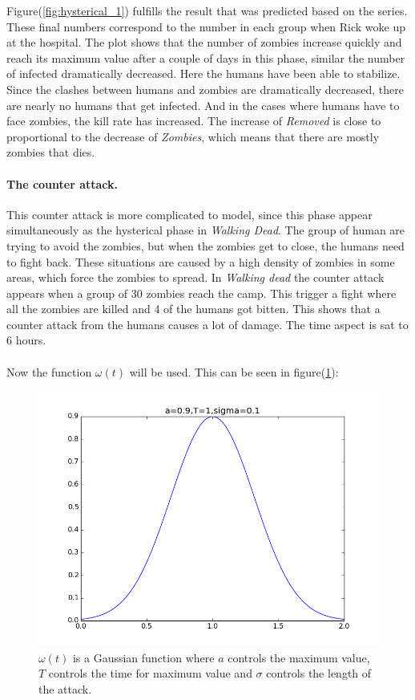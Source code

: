 \documentclass[%
twoside,                 %
final,                   %
10pt]{article}
\begin{document}
Figure(\ref{fig:hysterical_1}) fulfills the result that was predicted based on the series. These final numbers correspond to the number in each group when Rick woke up at the hospital. The plot shows that the number of zombies increase quickly and reach its maximum value after a couple of days in this phase, similar the number of infected dramatically decreased. Here the humans have been able to stabilize. Since the clashes between humans and zombies are dramatically decreased, there are nearly no humans that get infected. And in the cases where humans have to face zombies, the kill rate has increased. The increase of \emph{Removed} is close to proportional to the decrease of \emph{Zombies}, which means that there are mostly zombies that dies.

\paragraph{The counter attack.}
\label{section:counter_attack}
This counter attack is more complicated to model, since this phase appear simultaneously as the hysterical phase in \emph{Walking Dead}. The group of human are trying to avoid the zombies, but when the zombies get to close, the humans need to fight back. These situations are caused by a high density of zombies in some areas, which force the zombies to spread. In \emph{Walking dead} the counter attack appears when a group of 30 zombies reach the camp. This trigger a fight where all the zombies are killed and 4 of the humans got bitten. This shows that a counter attack from the humans causes a lot of damage. The time aspect is sat to 6 hours.  
\\
\\
Now the function $\omega(t)$ will be used. This can be seen in figure(\ref{fig:omega_function}):


\begin{figure}[ht]
  \centerline{\includegraphics[width=0.9\linewidth]{plots/omega_function.png}}
  \caption{
  \label{fig:omega_function} $\omega (t)$ is a Gaussian function where $a$ controls the maximum value, $T$ controls the time for maximum value and $\sigma$ controls the length of the attack.
  }
\end{figure}
\end{document}
